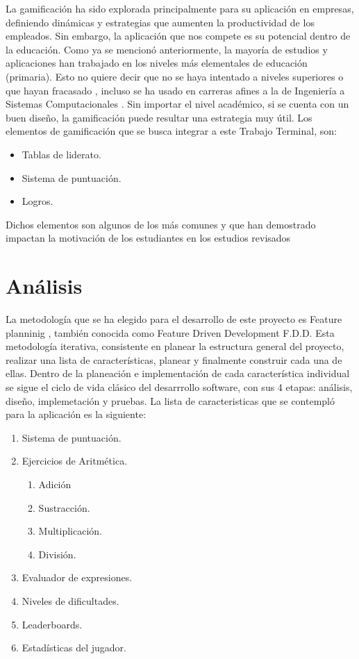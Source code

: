 \documentclass{article}
\begin{document}
La gamificación ha sido explorada principalmente para su aplicación en empresas, definiendo dinámicas y estrategias que aumenten la productividad de los empleados. Sin embargo, la aplicación que nos compete es su potencial dentro de la educación. Como ya se mencionó anteriormente, la mayoría de estudios y aplicaciones han trabajado en los niveles más elementales de educación (primaria)\cite{rodrigues2017math}. Esto no quiere decir que no se haya intentado a niveles superiores o que hayan fracasado \cite{wiggins2016overview,sanchez2017classcraft,tan2018}, incluso se ha usado
en carreras afines a la de Ingeniería a Sistemas Computacionales \cite{ibanez2014gamification}. Sin importar el nivel académico, si
se cuenta con un buen diseño, la gamificación puede resultar una estrategia muy útil. Los elementos de
gamificación que se busca integrar a este Trabajo Terminal, son:

\begin{itemize}
\item{Tablas de liderato.}
\item{Sistema de puntuación.}
\item{Logros.}
\end{itemize}

Dichos elementos son algunos de los más comunes y que han demostrado impactan la motivación de los
estudiantes en los estudios revisados  \cite{wiggins2016overview,sanchez2017classcraft,ibanez2014gamification,tan2018}
\pagebreak
\section{Análisis}

La metodología que se ha elegido para el desarrollo de este proyecto es Feature planninig 
\cite{hunt2006feature}, también conocida como Feature Driven 
Development F.D.D. Esta metodología iterativa, consistente en planear
la estructura general del proyecto, realizar una lista de características, planear  y finalmente 
construir cada una de ellas. Dentro de la planeación e implementación de cada característica individual se sigue el ciclo de vida clásico del desarrrollo software, con sus 4 etapas: análisis, diseño, implemetación y pruebas. 
La lista de caracteristicas que se contempló para la aplicación es la siguiente:
\begin{enumerate}
	\item Sistema de puntuación.
	\item Ejercicios de Aritmética.
	\begin{enumerate}
		\item Adición 
		\item Sustracción.
		\item Multiplicación.
		\item División.
	\end{enumerate}
	\item Evaluador de expresiones.
	\item Niveles de dificultades.
	\item Leaderboards.
	\item Estadísticas del jugador.
\end{enumerate}
\end{document}
